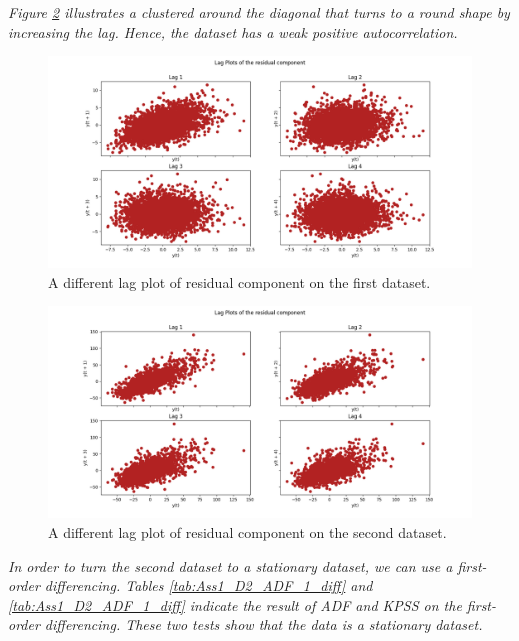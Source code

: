 \textit{Figure \ref{fig:Ass1_D2_Lag_Plots_residual} illustrates a clustered around the diagonal that turns to a round shape by increasing the lag. Hence, the dataset has a weak positive autocorrelation. }

\begin{figure}[H]
    \centering
    \begin{minipage}[b]{1\textwidth}
        \includegraphics[width=\textwidth]{figures/Ass1/Ass1_D1_Lag_Plots_residual.png}
    \end{minipage}
    \caption{A different lag plot of residual component on the first dataset.}
    \label{fig:Ass1_D1_Lag_Plots_residual}
\end{figure}

\begin{figure}[H]
    \centering
    \begin{minipage}[b]{1\textwidth}
        \includegraphics[width=\textwidth]{figures/Ass1/Ass1_D2_Lag_Plots_residual.png}
    \end{minipage}
    \caption{A different lag plot of residual component on the second dataset.}
    \label{fig:Ass1_D2_Lag_Plots_residual}
\end{figure}

\textit{In order to turn the second dataset to a stationary dataset, we can use a first-order differencing. Tables \ref{tab:Ass1_D2_ADF_1_diff} and \ref{tab:Ass1_D2_ADF_1_diff} indicate the result of \gls{ADF} and \gls{KPSS} on the first-order differencing. These two tests show that the data is a stationary dataset.}

